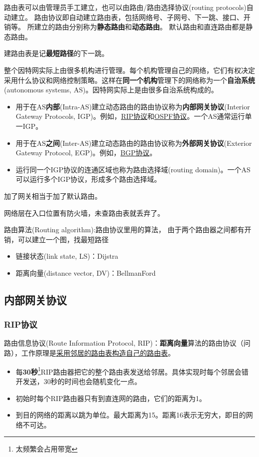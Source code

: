 路由表可以由管理员手工建立，也可以由路由/路由选择协议(routing protocols)自动建立。
路由协议即自动建立路由表，包括网络号、子网号、下一跳、接口、开销等。
所建立的路由分别称为\textbf{静态路由}和\textbf{动态路由}。
默认路由和直连路由都是静态路由。

建路由表是记\textbf{最短路径}的下一跳。

整个因特网实际上由很多机构进行管理。每个机构管理自己的网络，它们有权决定采用什么协议和网络控制策略。这样在\textbf{同一个机构}管理下的网络称为一个\textbf{自治系统}(autonomous systems, AS)。因特网实际上是由很多自治系统构成的。
\begin{itemize}
	\item 用于在AS\textbf{内部}(Intra-AS)建立动态路由的路由协议称为\textbf{内部网关协议}(Interior Gateway Protocols, IGP)。例如，\underline{RIP协议}和\underline{OSPF协议}。一个AS通常运行单一IGP。
	\item 用于在AS\textbf{之间}(Inter-AS)建立动态路由的路由协议称为\textbf{外部网关协议}(Exterior Gateway Protocol, EGP)。例如，\underline{BGP协议}。
	\item 运行同一个IGP协议的连通区域也称为路由选择域(routing domain)。一个AS可以运行多个IGP协议，形成多个路由选择域。
\end{itemize}

加了网关相当于加了默认路由。

网络层在入口位置有防火墙，未查路由表就丢弃了。

路由算法(Routing algorithm):路由协议里用的算法， 由于两个路由器之间都有开销，可以建立一个图，找最短路径
\begin{itemize}
	\item 链接状态(link state, LS)：Dijstra
	\item 距离向量(distance vector, DV)：BellmanFord
\end{itemize}

\subsection{内部网关协议}
\subsubsection{RIP协议}
路由信息协议(Route Information Protocol, RIP)：\textbf{距离向量}算法的路由协议（问路），工作原理是\underline{采用邻居的路由表构造自己的路由表}。
\begin{itemize}
	\item 每\textbf{30秒}\footnote{太频繁会占用带宽}RIP路由器把它的整个路由表发送给邻居。具体实现时每个邻居会错开发送，30秒的时间也会随机变化一点。
	\item 初始时每个RIP路由器只有到直连网的路由，它们的距离为1。
	\item 到目的网络的距离以跳为单位。最大距离为15。距离16表示无穷大，即目的网络不可达。
\end{itemize}

